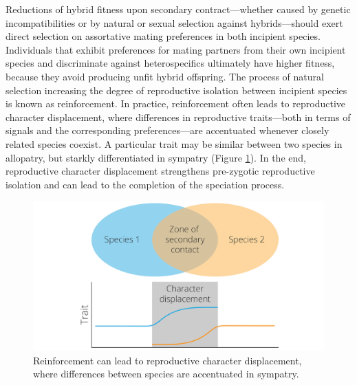 \documentclass[
]{book}
\begin{document}
Reductions of hybrid fitness upon secondary contract---whether caused by genetic incompatibilities or by natural or sexual selection against hybrids---should exert direct selection on assortative mating preferences in both incipient species. Individuals that exhibit preferences for mating partners from their own incipient species and discriminate against heterospecifics ultimately have higher fitness, because they avoid producing unfit hybrid offspring. The process of natural selection increasing the degree of reproductive isolation between incipient species is known as reinforcement. In practice, reinforcement often leads to reproductive character displacement, where differences in reproductive traits---both in terms of signals and the corresponding preferences---are accentuated whenever closely related species coexist. A particular trait may be similar between two species in allopatry, but starkly differentiated in sympatry (Figure \ref{fig:reinforcement}). In the end, reproductive character displacement strengthens pre-zygotic reproductive isolation and can lead to the completion of the speciation process.

\begin{figure}
\includegraphics[width=1\linewidth]{images/Character_Displacement} \caption{Reinforcement can lead to reproductive character displacement, where differences between species are accentuated in sympatry.}\label{fig:reinforcement}
\end{figure}
\end{document}
